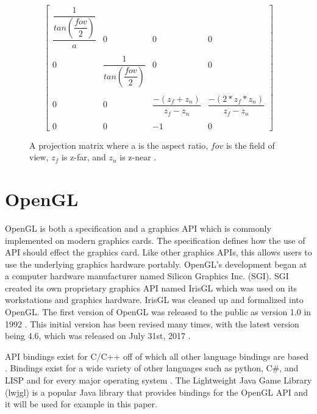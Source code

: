 \documentclass{article}
\begin{document}
\begin{figure}[h]
    \[
	  \begin{bmatrix}
        \dfrac{\dfrac{1}{tan(\dfrac{\mathit{fov}}{2})}}{a} &
        0 &
        0 &
        0 \\ \\
        0 &
        \dfrac{1}{tan(\dfrac{\mathit{fov}}{2})} &
        0 &
        0 \\ \\
        0 &
        0 &
        \dfrac{-(z_f + z_n)}{z_f - z_n} &
        \dfrac{-(2 * z_f * z_n)}{z_f - z_n} \\ \\
        0 &
        0 &
        -1 &
        0
      \end{bmatrix}
    \]
    \caption{A projection matrix where a is the aspect ratio, $\mathit{fov}$ is the field of view, $z_f$ is z-far, and $z_n$ is z-near \cite{hernandez2019}.}
    \label{fig:matrix}
\end{figure}


\section{OpenGL}
OpenGL is both a specification and a graphics API which is commonly implemented on modern graphics cards. The specification defines how the use of API should effect the graphics card. Like other graphics APIs, this allows users to use the underlying graphics hardware portably. OpenGL's development began at a computer hardware manufacturer named Silicon Graphics Inc. (SGI). SGI created its own proprietary graphics API named IrisGL which was used on its workstations and graphics hardware. IrisGL was cleaned up and formalized into OpenGL. The first version of OpenGL was released to the public as version 1.0 in 1992 \cite{openglwiki2018}. This initial version has been revised many times, with the latest version being 4.6, which was released on July 31st, 2017 \cite{openglwiki2018}.

API bindings exist for C/C++ off of which all other language bindings are based \cite{openglwiki2018}. Bindings exist for a wide variety of other languages such as python, C\#, and LISP and for every major operating system \cite{openglwiki2018}. The Lightweight Java Game Library (lwjgl) is a popular Java library that provides bindings for the OpenGL API and it will be used for example in this paper.
\end{document}
